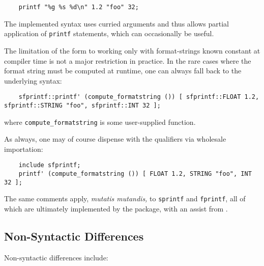 \begin{verbatim}
    printf "%g %s %d\n" 1.2 "foo" 32;
\end{verbatim}

The implemented syntax uses curried arguments and thus allows partial 
application of {\tt printf} statements, which can occasionally be useful.

The limitation of the form to working only with format-strings 
known constant at compiler time is not a major restriction in practice. 
In the rare cases where the format string must be computed at runtime, 
one can always fall back to the underlying syntax: 

\begin{verbatim}
    sfprintf::printf' (compute_formatstring ()) [ sfprintf::FLOAT 1.2, sfprintf::STRING "foo", sfprintf::INT 32 ];
\end{verbatim}

where {\tt compute\_formatstring} is some user-supplied function. 

As always, one may of course dispense with the qualifiers via wholesale importation: 
\begin{verbatim}
    include sfprintf;
    printf' (compute_formatstring ()) [ FLOAT 1.2, STRING "foo", INT 32 ];
\end{verbatim}


The same comments apply, {\it mutatis mutandis,}  to {\tt sprintf} and {\tt fprintf}, all of which are ultimately implemented by the 
 package, with an assist from 
.

\cutend*

\subsection{Non-Syntactic Differences}
Non-syntactic differences include:

